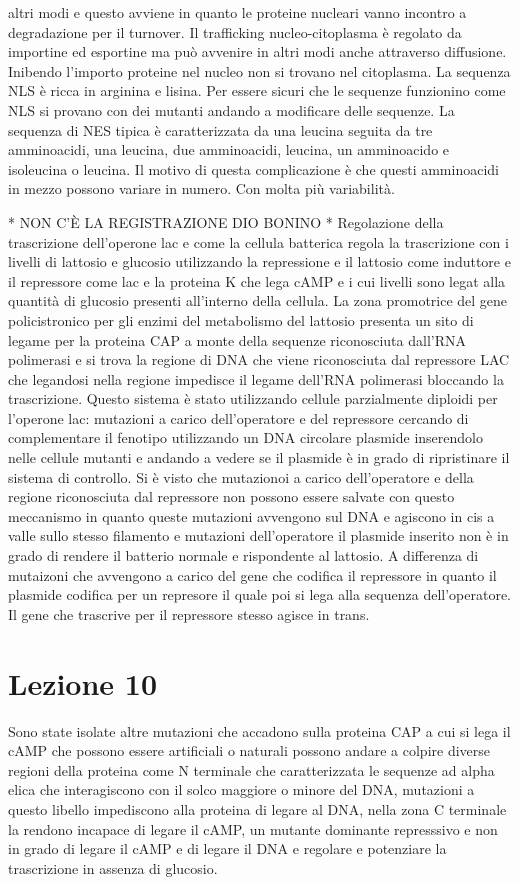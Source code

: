 altri modi e questo avviene in quanto le proteine nucleari vanno incontro a degradazione per il turnover. Il trafficking nucleo-citoplasma \`e regolato da importine ed esportine ma pu\`o
avvenire in altri modi anche attraverso diffusione. Inibendo l'importo proteine nel nucleo non si trovano nel citoplasma. La sequenza NLS \`e ricca in arginina e lisina. Per essere sicuri
che le sequenze funzionino come NLS si provano con dei mutanti andando a modificare delle sequenze. La sequenza di NES tipica \`e caratterizzata da una leucina seguita da tre amminoacidi,
una leucina, due amminoacidi, leucina, un amminoacido e isoleucina o leucina. Il motivo di questa complicazione \`e che questi amminoacidi in mezzo possono variare in numero. Con molta 
pi\`u variabilit\`a. 

* NON C'\`E LA REGISTRAZIONE DIO BONINO * 
Regolazione della trascrizione dell'operone lac e come la cellula batterica regola la trascrizione con i livelli di lattosio e glucosio utilizzando la repressione e il lattosio come
induttore e il repressore come lac e la proteina K che lega cAMP e i cui livelli sono legat alla quantit\`a di glucosio presenti all'interno della cellula. La zona promotrice del
gene policistronico per gli enzimi del metabolismo del lattosio presenta un sito di legame per la proteina CAP a monte della sequenze riconosciuta dall'RNA polimerasi e si trova la 
regione di DNA che viene riconosciuta dal repressore LAC che legandosi nella regione impedisce il legame dell'RNA polimerasi bloccando la trascrizione. Questo sistema \`e stato 
utilizzando cellule parzialmente diploidi per l'operone lac: mutazioni a carico dell'operatore e del repressore cercando di complementare il fenotipo utilizzando un DNA circolare plasmide
inserendolo nelle cellule mutanti e andando a vedere se il plasmide \`e in grado di ripristinare il sistema di controllo. Si \`e visto che mutazionoi a carico dell'operatore e della
regione riconosciuta dal repressore non possono essere salvate con questo meccanismo in quanto queste mutazioni avvengono sul DNA e agiscono in cis a valle sullo stesso filamento e 
mutazioni dell'operatore il plasmide inserito non \`e in grado di rendere il batterio normale e rispondente al lattosio. A differenza di mutaizoni che avvengono a carico del gene che
codifica il repressore in quanto il plasmide codifica per un represore il quale poi si lega alla sequenza dell'operatore. Il gene che trascrive per il repressore stesso agisce in trans. 
\section{Lezione 10}
Sono state isolate altre mutazioni che accadono sulla proteina CAP a cui si lega il cAMP che possono essere artificiali o naturali possono andare a colpire diverse regioni della proteina
come N terminale che caratterizzata le sequenze ad alpha elica che interagiscono con il solco maggiore o minore del DNA, mutazioni a questo libello impediscono alla proteina di legare
al DNA, nella zona C terminale la rendono incapace di legare il cAMP, un mutante dominante represssivo e non in grado di legare il cAMP e di legare il DNA e regolare e potenziare la 
trascrizione in assenza di glucosio. 
